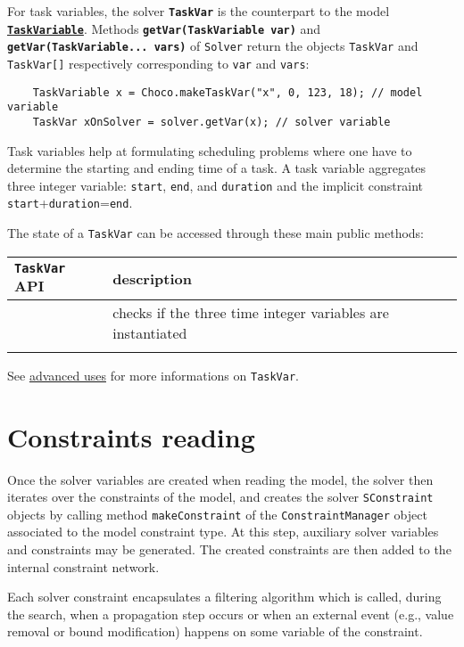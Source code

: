 For task variables, the solver \textbf{\tt TaskVar} is the counterpart to the model \hyperlink{taskvariable}{\textbf{\tt TaskVariable}}. 
Methods \textbf{\tt getVar(TaskVariable var)} and \textbf{\tt getVar(TaskVariable... vars)} of \texttt{Solver} return the objects \texttt{TaskVar} and \texttt{TaskVar[]} respectively corresponding to \texttt{var} and \texttt{vars}:
\begin{lstlisting}
	TaskVariable x = Choco.makeTaskVar("x", 0, 123, 18); // model variable
	TaskVar xOnSolver = solver.getVar(x); // solver variable
\end{lstlisting}

Task variables help at formulating scheduling problems where one have to determine the starting and ending time of a task. A task variable aggregates three integer variable: \texttt{start}, \texttt{end}, and \texttt{duration} and the implicit constraint \texttt{start}+\texttt{duration}=\texttt{end}. 

The state of a \texttt{TaskVar} can be accessed through these main public methods:

\noindent\begin{tabular}{p{.3\linewidth}p{.7\linewidth}}
  \hline
  \texttt{TaskVar} API &  description \\
  \hline
	\mylst{isInstantiated()} &checks if the three time integer variables are instantiated\\
  \hline\\
\end{tabular}

\noindent See \hyperlink{advanced}{advanced uses} for more informations on \texttt{TaskVar}.

\section{Constraints reading}\label{solver:constraintsreading}\hypertarget{solver:constraintsreading}{}
Once the solver variables are created when reading the model, the solver then iterates over the constraints of the model, and creates the solver \texttt{SConstraint} objects  by calling method \texttt{makeConstraint} of the \texttt{ConstraintManager} object associated to the model constraint type.
At this step, auxiliary solver variables and constraints may be generated. The created constraints are then added to the internal constraint network. 

Each solver constraint encapsulates a filtering algorithm which is called, during the search, when a propagation step occurs or when an external event (e.g., value removal or bound modification) happens on some variable of the constraint.


